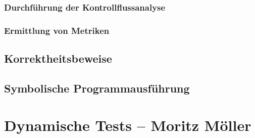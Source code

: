 \documentclass[	%
		fontsize=11pt,  %
		a4paper,	    %
		german,		%
		sans,			%
		f4,				%
	]{HsH-report}		%
\begin{document}
		\subsection{Durchführung der Kontrollflussanalyse}
			\lipsum[1]
		\subsection{Ermittlung von Metriken}
			\lipsum[1]
	\section{Korrektheitsbeweise}
		\lipsum[1-2]
	\section{Symbolische Programmausführung}
		\lipsum[1-2]

\chapter{Dynamische Tests -- Moritz Möller} \label{chap: dynamic}
	\lipsum[1-20]

\printbibliography
\end{document}
